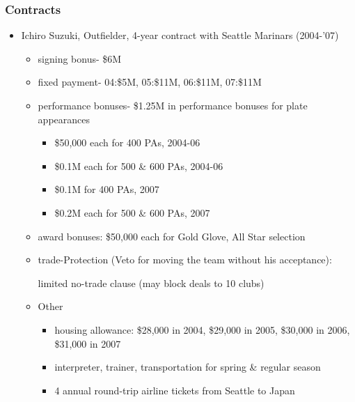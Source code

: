 \documentclass[dvipdfmx,12pt]{beamer}
\begin{document}
\begin{frame}\frametitle{Contracts}
  \begin{itemize}
    \footnotesize
    \item Ichiro Suzuki, Outfielder, 4-year contract with Seattle Marinars (2004-'07)
    \begin{itemize}
      \footnotesize
      \item signing bonus- \$6M

      \item fixed payment- 04:\$5M, 05:\$11M, 06:\$11M, 07:\$11M

      \item performance bonuses- \$1.25M in performance bonuses for plate appearances

      \begin{itemize}
        \footnotesize
        \item \$50,000 each for 400 PAs, 2004-06

        \item \$0.1M each for 500 \& 600 PAs, 2004-06

        \item \$0.1M for 400 PAs, 2007

        \item \$0.2M each for 500 \& 600 PAs, 2007
      \end{itemize}

      \item award bonuses: \$50,000 each for Gold Glove, All Star selection

      \item trade-Protection (Veto for moving the team without his acceptance):

      limited no-trade clause (may block deals to 10 clubs)

      \item Other

      \begin{itemize}
        \footnotesize
        \item housing allowance: \$28,000 in 2004, \$29,000 in 2005, \$30,000 in 2006, \$31,000 in 2007

        \item interpreter, trainer, transportation for spring \& regular season

        \item 4 annual round-trip airline tickets from Seattle to Japan
      \end{itemize}
    \end{itemize}
  \end{itemize}
\end{frame}
\end{document}
